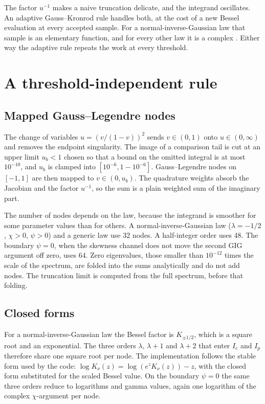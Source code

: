 \documentclass[article]{jss}
\begin{document}
The factor $u^{-1}$ makes a naive truncation delicate, and the integrand oscillates.
An adaptive Gauss--Kronrod rule handles both, at the cost of a new Bessel evaluation at every accepted sample.
For a normal-inverse-Gaussian law that sample is an elementary function, and for every other law it is a complex .
Either way the adaptive rule repeats the work at every threshold.

\section{A threshold-independent rule} \label{sec:rule}

\subsection{Mapped Gauss--Legendre nodes}

The change of variables $u=(v/(1-v))^2$ sends $v\in(0,1)$ onto $u\in(0,\infty)$ and removes the endpoint singularity.
The image of a comparison tail is cut at an upper limit $u_b<1$ chosen so that a bound on the omitted integral is at most $10^{-10}$, and $u_b$ is clamped into $[10^{-6},1-10^{-6}]$.
Gauss--Legendre nodes on $[-1,1]$ are then mapped to $v\in(0,u_b)$.
The quadrature weights absorb the Jacobian and the factor $u^{-1}$, so the sum is a plain weighted sum of the imaginary part.

The number of nodes depends on the law, because the integrand is smoother for some parameter values than for others.
A normal-inverse-Gaussian law ($\lambda=-1/2$, $\chi>0$, $\psi>0$) and a generic law use 32 nodes.
A half-integer order uses 48.
The boundary $\psi=0$, when the skewness channel does not move the second GIG argument off zero, uses 64.
Zero eigenvalues, those smaller than $10^{-12}$ times the scale of the spectrum, are folded into the sums analytically and do not add nodes.
The truncation limit is computed from the full spectrum, before that folding.

\subsection{Closed forms}

For a normal-inverse-Gaussian law the Bessel factor is $K_{\pm 1/2}$, which is a square root and an exponential.
The three orders $\lambda$, $\lambda+1$ and $\lambda+2$ that enter $I_c$ and $I_p$ therefore share one square root per node.
The implementation follows the stable form used by the  code: $\log K_\nu(z)=\log(e^{z}K_\nu(z))-z$, with the closed form substituted for the scaled Bessel value.
On the boundary $\psi=0$ the same three orders reduce to logarithms and gamma values, again one logarithm of the complex $\chi$-argument per node.
\end{document}
